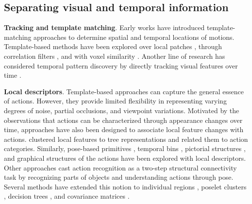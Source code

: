 \subsection{Separating visual and temporal information}
\label{sec:modeling::separate}

\noindent
\textbf{Tracking and template matching}. Early works \citep{bobick2001recognition} have introduced template-matching approaches to determine spatial and temporal locations of motions. Template-based methods have been explored over local patches \citep{shechtman2005space}, through correlation filters \citep{rodriguez2008action}, and with voxel similarity \citep{ke2007spatio}. Another line of research has considered temporal pattern discovery by directly tracking visual features over time \citep{cipolla1990dynamic,isard1998condensation,rohr1994towards}. 


\noindent
\textbf{Local descriptors}. Template-based approaches can capture the general essence of actions. However, they provide limited flexibility in representing varying degrees of noise, partial occlusions, and viewpoint variations. Motivated by the observations that actions can be characterized through appearance changes over time, approaches have also been designed to associate local feature changes with actions. \citet{mikolajczyk2008action} clustered local features to tree representations and related them to action categories. Similarly, pose-based primitives \citep{thurau2008pose}, temporal bins \citep{nowozin2007discriminative}, pictorial structures \citep{tran2012part}, and graphical structures of the actions \citep{ni2014multiple} have been explored with local descriptors. Other approaches \citep{gupta2009observing,yao2010modeling} cast action recognition as a two-step structural connectivity task by recognizing parts of objects and understanding actions through pose.
Several methods have extended this notion to individual regions \citep{ikizler2010object}, poselet clusters \citep{pishchulin2013strong}, decision trees \citep{rahmani2014real}, and covariance matrices \citep{kviatkovsky2014online}.


